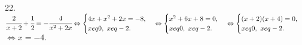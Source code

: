 22. $\cfrac{2}{x+2}+\cfrac{1}{2}=-\cfrac{4}{x^2+2x}\Leftrightarrow\begin{cases} 4x+x^2+2x=-8,\\ x
eq0,\ x
eq-2.\end{cases}\Leftrightarrow
\begin{cases} x^2+6x+8=0,\\ x
eq0,\ x
eq-2.\end{cases}\Leftrightarrow\begin{cases} (x+2)(x+4)=0,\\ x
eq0,\ x
eq-2.\end{cases}$\\$\Leftrightarrow x=-4.$\\

